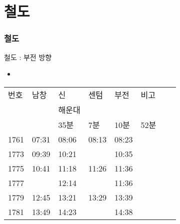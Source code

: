 \documentclass[aspectratio=1610,20pt,xcolor=pdftex,dvipsnames,table,handout]{beamer}
\begin{document}
		
		\section{철도}


		\begin{frame} [t,plain]
		\frametitle{철도}

			\begin{block} {철도 : 부전 방향 }
			\setlength{\leftmargini}{2em}			
			\begin{itemize}
				\item 
			\end{itemize}
			\end{block}						

		   \begin{center}
			\label{table:second}
			\setlength{\tabcolsep}{2pt}

			\footnotesize {

		     	\begin{tabularx}{\textwidth}{ 	m{} 	%
										m{} 	%
										m{}  	%
										m{}  	%
										m{}  	%
										m{}  	%
										m{}  	%
										m{}    	%
										}\hline

				번호  	& 남창		& 신  		& 센텀 			& 부전 		&비고	\\ 
					  	& 			& 해운대	  	&  				& 	 		&		\\ \hline \hline

					  	& 			& 	35분		& 7분 			& 10분	 	& 52분		\\ \hline \hline
																						
				1761	& 	07:31	&	08:06	&	08:13		&	08:23		&  \\ \hline
				1773	& 	09:39	&	10:21	&				&	10:35		&  \\ \hline
				1775	& 	10:41	&	11:18	&	11:26		&	11:36		&  \\ \hline

				1777	& 			&	12:14	&				&	11:36		&  \\ \hline

				1779	& 	12:45	&	13:21	&	13:29		&	13:39		&  \\ \hline
				1781	& 	13:49	&	14:23	&				&	14:38		&  \\ \hline


\end{tabularx}}
\end{center}
\end{frame}
\end{document}
